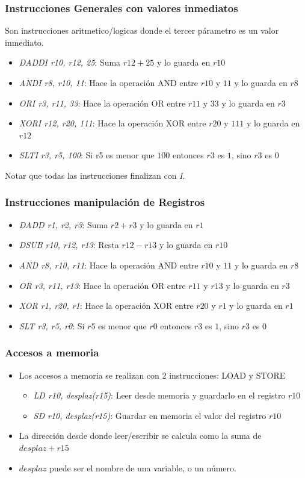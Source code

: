 \documentclass{beamer}
\begin{document}
\begin{frame}
\frametitle{Instrucciones Generales con valores inmediatos}
Son instrucciones aritmetico/logicas donde el tercer párametro es un valor inmediato.
\begin{itemize}
\item \emph{DADDI r10, r12, 25}: Suma $r12 + 25$ y lo guarda en $r10$
\item \emph{ANDI r8, r10, 11}: Hace la operación AND entre  $r10$ y $11$ y lo guarda en $r8$
\item \emph{ORI r3, r11, 33}: Hace la operación OR entre  $r11$ y $33$ y lo guarda en $r3$
\item \emph{XORI r12, r20, 111}: Hace la operación XOR entre  $r20$ y $111$ y lo guarda en $r12$
\item \emph{SLTI r3, r5, 100}: Si r5 es menor que $100$ entonces $r3$ es $1$, sino $r3$ es $0$
\end{itemize}
Notar que todas las instrucciones finalizan con \emph{I}.
\end{frame}

\begin{frame}
\frametitle{Instrucciones manipulación de Registros}
\begin{itemize}
\item \emph{DADD r1, r2, r3}: Suma $r2 + r3$ y lo guarda en $r1$
\item \emph{DSUB r10, r12, r13}: Resta $r12 - r13$ y lo guarda en $r10$
\item \emph{AND r8, r10, r11}: Hace la operación AND entre  $r10$ y $11$ y lo guarda en $r8$
\item \emph{OR r3, r11, r13}: Hace la operación OR entre  $r11$ y $r13$ y lo guarda en $r3$
\item \emph{XOR r1, r20, r1}: Hace la operación XOR entre  $r20$ y $r1$ y lo guarda en $r1$
\item \emph{SLT r3, r5, r0}: Si $r5$ es menor que $r0$ entonces $r3$ es $1$, sino $r3$ es $0$
\end{itemize}
\end{frame}

\begin{frame}[fragile]
\frametitle{Accesos a memoria}
\begin{itemize}
\item Los accesos a memoria se realizan con 2 instrucciones: LOAD y STORE
\begin{itemize}
\item \emph{LD r10, desplaz(r15)}: Leer desde memoria y guardarlo en el registro $r10$
\item \emph{SD r10, desplaz(r15)}: Guardar en memoria el valor del registro $r10$
\end{itemize}
\item La dirección desde donde leer/escribir se calcula como la suma de $desplaz + r15$
\item $desplaz$ puede ser el nombre de una variable, o un número.
\end{itemize}
\end{frame}
\end{document}
